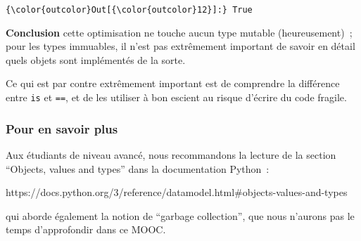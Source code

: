 \begin{Verbatim}[commandchars=\\\{\}]
{\color{outcolor}Out[{\color{outcolor}12}]:} True
\end{Verbatim}
            
    \textbf{Conclusion} cette optimisation ne touche aucun type mutable
(heureusement)~; pour les types immuables, il n'est pas extrêmement
important de savoir en détail quels objets sont implémentés de la sorte.

Ce qui est par contre extrêmement important est de comprendre la
différence entre \texttt{is} et \texttt{==}, et de les utiliser à bon
escient au risque d'écrire du code fragile.

    \hypertarget{pour-en-savoir-plus}{%
\subsubsection{Pour en savoir plus}\label{pour-en-savoir-plus}}

    Aux étudiants de niveau avancé, nous recommandons la lecture de la
section ``Objects, values and types'' dans la documentation Python~:

https://docs.python.org/3/reference/datamodel.html\#objects-values-and-types

qui aborde également la notion de ``garbage collection'', que nous
n'aurons pas le temps d'approfondir dans ce MOOC.


    
    
    
